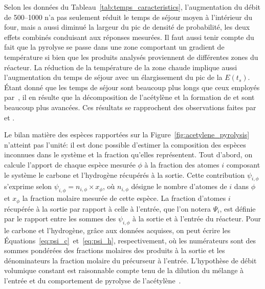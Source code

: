 Selon les données du Tableau~\ref{tab:temps_caracteristics}, l'augmentation du débit de \SIrange{500}{1000}{\sccm} n'a pas seulement réduit le temps de séjour moyen à l'intérieur du four, mais a aussi diminué la largeur du pic de densité de probabilité, les deux effets combinés conduisant aux réponses mesurées. %
Il faut aussi tenir compte du fait que la pyrolyse se passe dans une zone comportant un gradient de température si bien que les produits analysés proviennent de différentes zones du réacteur. La réduction de la température de la zone chaude implique aussi l'augmentation du temps de séjour avec un élargissement du pic de la $E(t_{s})$.  Étant donné que les temps de séjour sont beaucoup plus longs que ceux employés par~\citet{Norinaga2005,Norinaga2007}, il en résulte que la décomposition de l'acétylène et la formation de  et  sont beaucoup plus avancées. Ces résultats se rapprochent des observations faites par \citet{Graf2007} et \citet{Khan2008}.

Le bilan matière des espèces rapportées sur la Figure~\ref{fig:acetylene_pyrolysis} n'atteint pas l'unité: il est donc possible d'estimer la composition des espèces inconnues dans le système et la fraction qu'elles représentent. Tout d'abord, on calcule l'apport de chaque espèce mesurée $\phi$ à la fraction des atomes $i$ composant le système \textendash{} le carbone et l'hydrogène \textendash{} récupérés à la sortie. Cette contribution $\psi_{i,\phi}$ s'exprime selon $\psi_{i,\phi}=n_{i,\phi}\times x_{\phi}$, où $n_{i,\phi}$ désigne le nombre d'atomes de $i$ dans $\phi$ et $x_{\phi}$ la fraction molaire mesurée de cette espèce. La fraction d'atomes $i$ récupérée à la sortie par rapport à celle à l'entrée, que l'on notera $\Psi_{i}$, est définie par le rapport entre les sommes des $\psi_{i,\phi}$ à la sortie et à l'entrée du réacteur.  Pour le carbone et l'hydrogène, grâce aux données acquises, on peut écrire les Équations~\ref{eq:psi_c}~et~\ref{eq:psi_h}, respectivement, où les numérateurs sont des sommes pondérées des fractions molaires des produits à la sortie et les dénominateurs la fraction molaire du précurseur à l'entrée. L'hypothèse de débit volumique constant est raisonnable compte tenu de la dilution du mélange à l'entrée et du comportement de pyrolyse de l'acétylène~\cite{Norinaga2005}.

